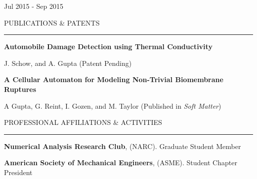 \documentclass[letterpaper,10pt,oneside]{article}
\begin{document}
\begin{body}
\begin{detail}
\begin{subtitle}
\vspace{-7.8ex}
{{Jul 2015 - Sep 2015}}
\end{subtitle}
\vspace{5ex}

{
\hspace{-1.72in}\noindent\color{cblue}
{PUBLICATIONS \& PATENTS} %
}


\vspace{-1ex}
{\hspace{-1.73in}\noindent\color{dblue}\rule{6.935in}{0.4pt}} %
\vspace{-2ex}

{\hspace{-1.76in}\fontsize{9}{1}
\textbf{Automobile Damage Detection using Thermal Conductivity}}

{\hspace{-1.76in}\fontsize{9}{1}
{J. Schow, and A. Gupta (Patent Pending)}
}

\vspace{1ex}

{\hspace{-1.76in}\fontsize{9}{1}
\textbf{A Cellular Automaton for Modeling Non-Trivial Biomembrane Ruptures}
}

{\hspace{-1.76in}\fontsize{9}{1} 
{A Gupta, G. Reint, I. Gozen, and M. Taylor (Published in \textit{Soft Matter})}}
\vspace{4ex}


{
\hspace{-1.72in}\noindent\color{cblue}
{PROFESSIONAL AFFILIATIONS \& ACTIVITIES} %
}

\vspace{-1ex}
{\hspace{-1.73in}\noindent\color{dblue}\rule{6.935in}{0.4pt}} %
\vspace{-2ex}

{\hspace{-1.73in}\small
\textbf{Numerical Analysis Research Club}, (NARC). Graduate Student Member }
\vspace{1ex}

{\hspace{-1.73in}\small
\textbf{American Society of Mechanical Engineers}, (ASME). Student Chapter President}
\vspace{1ex}


\end{detail}
\end{body}
\end{document}
